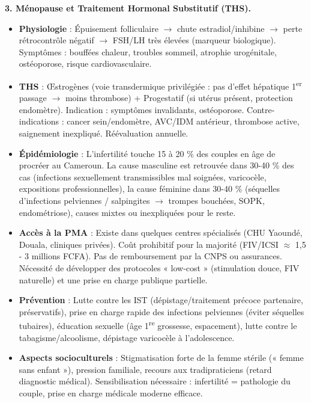 \documentclass[11pt]{article}
\begin{document}
\begin{exemplebox}
\textbf{3. Ménopause et Traitement Hormonal Substitutif (THS).}
\begin{itemize}
\item \textbf{Physiologie} : Épuisement folliculaire $\rightarrow$ chute estradiol/inhibine $\rightarrow$ perte rétrocontrôle négatif $\rightarrow$ FSH/LH très élevées (marqueur biologique). Symptômes : bouffées chaleur, troubles sommeil, atrophie urogénitale, ostéoporose, risque cardiovasculaire.
\item \textbf{THS} : Œstrogènes (voie transdermique privilégiée : pas d'effet hépatique 1\textsuperscript{er} passage $\rightarrow$ moins thrombose) + Progestatif (si utérus présent, protection endomètre). Indication : symptômes invalidants, ostéoporose. Contre-indications : cancer sein/endomètre, AVC/IDM antérieur, thrombose active, saignement inexpliqué. Réévaluation annuelle.
\end{itemize}
\end{exemplebox}

\begin{savaistu}
\begin{itemize}
\item \textbf{Épidémiologie} : L'infertilité touche 15 à 20 \% des couples en âge de procréer au Cameroun. La cause masculine est retrouvée dans 30-40 \% des cas (infections sexuellement transmissibles mal soignées, varicocèle, expositions professionnelles), la cause féminine dans 30-40 \% (séquelles d'infections pelviennes / salpingites $\rightarrow$ trompes bouchées, SOPK, endométriose), causes mixtes ou inexpliquées pour le reste.
\item \textbf{Accès à la PMA} : Existe dans quelques centres spécialisés (CHU Yaoundé, Douala, cliniques privées). Coût prohibitif pour la majorité (FIV/ICSI $\approx$ 1,5 - 3 millions FCFA). Pas de remboursement par la CNPS ou assurances. Nécessité de développer des protocoles « low-cost » (stimulation douce, FIV naturelle) et une prise en charge publique partielle.
\item \textbf{Prévention} : Lutte contre les IST (dépistage/traitement précoce partenaire, préservatifs), prise en charge rapide des infections pelviennes (éviter séquelles tubaires), éducation sexuelle (âge 1\textsuperscript{re} grossesse, espacement), lutte contre le tabagisme/alcoolisme, dépistage varicocèle à l'adolescence.
\item \textbf{Aspects socioculturels} : Stigmatisation forte de la femme stérile (« femme sans enfant »), pression familiale, recours aux tradipraticiens (retard diagnostic médical). Sensibilisation nécessaire : infertilité = pathologie du couple, prise en charge médicale moderne efficace.
\end{itemize}
\end{savaistu}
\end{document}
